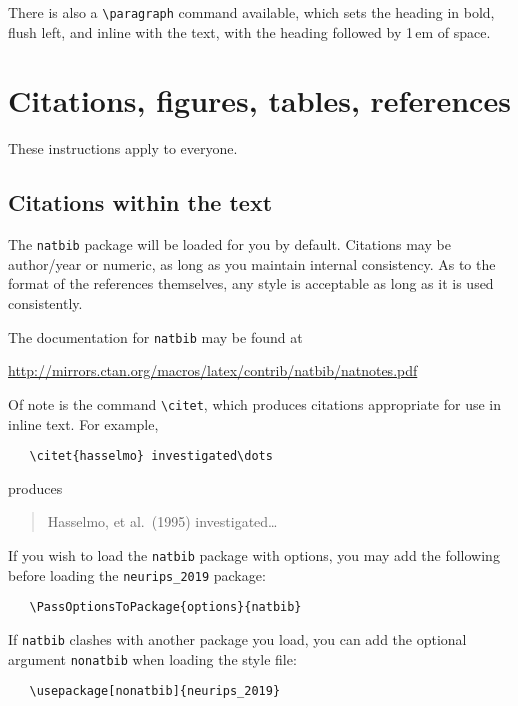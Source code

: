 \documentclass{article}
\begin{document}
There is also a \verb+\paragraph+ command available, which sets the heading in
bold, flush left, and inline with the text, with the heading followed by 1\,em
of space.

\section{Citations, figures, tables, references}
\label{others}

These instructions apply to everyone.

\subsection{Citations within the text}

The \verb+natbib+ package will be loaded for you by default.  Citations may be
author/year or numeric, as long as you maintain internal consistency.  As to the
format of the references themselves, any style is acceptable as long as it is
used consistently.

The documentation for \verb+natbib+ may be found at
\begin{center}
  \url{http://mirrors.ctan.org/macros/latex/contrib/natbib/natnotes.pdf}
\end{center}
Of note is the command \verb+\citet+, which produces citations appropriate for
use in inline text.  For example,
\begin{verbatim}
   \citet{hasselmo} investigated\dots
\end{verbatim}
produces
\begin{quote}
  Hasselmo, et al.\ (1995) investigated\dots
\end{quote}

If you wish to load the \verb+natbib+ package with options, you may add the
following before loading the \verb+neurips_2019+ package:
\begin{verbatim}
   \PassOptionsToPackage{options}{natbib}
\end{verbatim}

If \verb+natbib+ clashes with another package you load, you can add the optional
argument \verb+nonatbib+ when loading the style file:
\begin{verbatim}
   \usepackage[nonatbib]{neurips_2019}
\end{verbatim}
\end{document}
